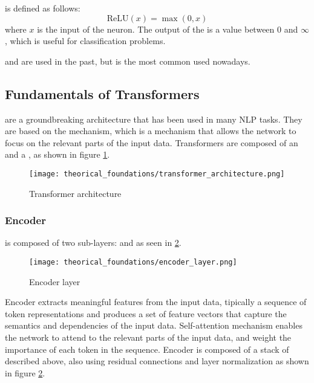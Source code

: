        is defined as follows\cite{goodfellow2016deep}:
      \begin{equation}
        \label{eq:relu_activation_function}
        \text{ReLU}(x) = \max(0, x)
      \end{equation}
      where $x$ is the input of the neuron. The output of the  is a value between 0 and $\infty$, which is useful for classification
      problems\cite{goodfellow2016deep, intelligence2021modern}.

       and  are used in the past, but  is the most
      common  used nowadays\cite{goodfellow2016deep, intelligence2021modern}.
  
  \subsection{Fundamentals of Transformers}

     are a groundbreaking architecture that has been used in
    many NLP tasks\cite{goodfellow2016deep}. They are based on the 
    mechanism, which is a mechanism that allows the network to focus on the
    relevant parts of the input data\cite{goodfellow2016deep, vaswani2017attention}.
    Transformers are composed of an  and a , as shown
    in figure \ref{fig:transformer_architecture}.
    \begin{figure}[htbp]
      \centering
      \texttt{[image: theorical\_foundations/transformer\_architecture.png]}
      \caption{Transformer architecture\cite{vaswani2017attention}}
      \label{fig:transformer_architecture}
    \end{figure}

    \subsubsection{Encoder}

       is composed of two sub-layers:  and
       as seen in \ref{fig:encoder_layer}.
      \begin{figure}[htbp]
        \centering
        \texttt{[image: theorical\_foundations/encoder\_layer.png]}
        \caption{Encoder layer\cite{vaswani2017attention}}
        \label{fig:encoder_layer}
      \end{figure}
      Encoder extracts meaningful features from the input data, tipically
      a sequence of token representations and produces a set of feature vectors
      that capture the semantics and dependencies of the input data\cite{vaswani2017attention}.
      Self-attention mechanism enables the network to attend to the relevant
      parts of the input data, and weight the importance of each token in the
      sequence\cite{vaswani2017attention}. Encoder is composed of a stack of
       described above, also using residual connections and
      layer normalization as shown in figure \ref{fig:encoder_layer}.

